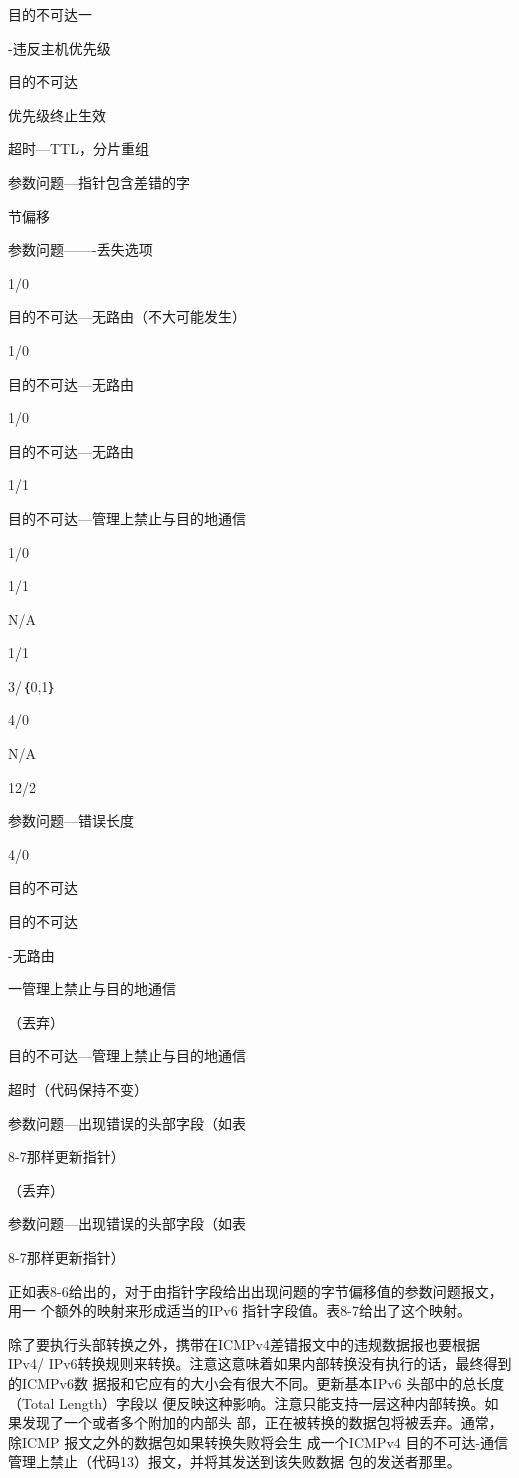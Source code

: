 目的不可达一

-违反主机优先级

目的不可达

优先级终止生效

超时—TTL，分片重组

参数问题—指针包含差错的字

节偏移

参数问题——-丢失选项

1/0

目的不可达—无路由（不大可能发生）

1/0

目的不可达—无路由

1/0

目的不可达—无路由

1/1

目的不可达—管理上禁止与目的地通信

1/0

1/1

N/A

1/1

3/｛0,1｝

4/0

N/A

12/2

参数问题—错误长度

4/0

目的不可达

目的不可达

-无路由

一管理上禁止与目的地通信

（丟弃）

目的不可达—管理上禁止与目的地通信

超时（代码保持不变）

参数问题—出现错误的头部字段（如表

8-7那样更新指针）

（丢弃）

参数问题—出现错误的头部字段（如表

8-7那样更新指针）

正如表8-6给出的，对于由指针字段给出出现问题的字节偏移值的参数问题报文，用一
个额外的映射来形成适当的IPv6 指针字段值。表8-7给出了这个映射。

除了要执行头部转换之外，携带在ICMPv4差错报文中的违规数据报也要根据IPv4/
IPv6转换规则来转换。注意这意味着如果内部转换没有执行的话，最终得到的ICMPv6数
据报和它应有的大小会有很大不同。更新基本IPv6 头部中的总长度（Total Length）字段以
便反映这种影响。注意只能支持一层这种内部转换。如果发现了一个或者多个附加的内部头
部，正在被转换的数据包将被丢弃。通常，除ICMP 报文之外的数据包如果转换失败将会生
成一个ICMPv4 目的不可达-通信管理上禁止（代码13）报文，并将其发送到该失败数据
包的发送者那里。

